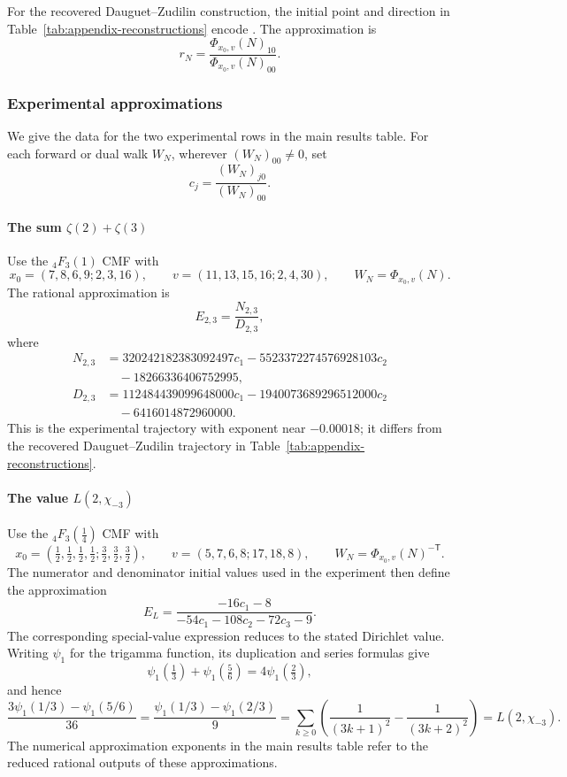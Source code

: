 \documentclass[oneside,english,11pt]{amsart}
\begin{document}
For the recovered Dauguet--Zudilin construction, the initial point and
direction in Table~\ref{tab:appendix-reconstructions} encode
\cite[Eq.~(27)]{dauguetZudilin2014}. The approximation is
\[
 r_N=\frac{\Phi_{x_0,v}(N)_{10}}{\Phi_{x_0,v}(N)_{00}}.
\]

\subsubsection{Experimental approximations}
\label{sec:appendix-extractions}

We give the data for the two experimental rows in
the main results table. For each forward or dual walk $W_N$, wherever $(W_N)_{00}\ne0$, set
\[
 c_j=\frac{(W_N)_{j0}}{(W_N)_{00}}.
\]

\paragraph{\texorpdfstring{The sum $\zeta(2)+\zeta(3)$}{The sum zeta(2)+zeta(3)}}
Use the ${}_4F_3(1)$ CMF with
\[
 x_0=(7,8,6,9;2,3,16),\qquad v=(11,13,15,16;2,4,30),
 \qquad W_N=\Phi_{x_0,v}(N).
\]
The rational approximation is
\[
 E_{2,3}=\frac{N_{2,3}}{D_{2,3}},
\]
where
\begin{align*}
N_{2,3}&=320242182383092497c_1-5523372274576928103c_2\\
          &\quad-18266336406752995,\\
D_{2,3}&=112484439099648000c_1-1940073689296512000c_2\\
          &\quad-6416014872960000.
\end{align*}
This is the experimental trajectory with exponent near $-0.00018$;
it differs from the recovered Dauguet--Zudilin trajectory in
Table~\ref{tab:appendix-reconstructions}.

\paragraph{\texorpdfstring{The value $L(2,\chi_{-3})$}{The value L(2,chi(-3))}}
Use the ${}_4F_3(\tfrac14)$ CMF with
\[
 x_0=(\tfrac12,\tfrac12,\tfrac12,\tfrac12;
       \tfrac32,\tfrac32,\tfrac32),\qquad
 v=(5,7,6,8;17,18,8),\qquad W_N=\Phi_{x_0,v}(N)^{-\mathsf T}.
\]
The numerator and denominator initial values used in the experiment then define the approximation
\[
 E_L=\frac{-16c_1-8}{-54c_1-108c_2-72c_3-9}.
\]
The corresponding special-value expression reduces to the stated
Dirichlet value. Writing $\psi_1$ for the trigamma function,
its duplication and series formulas \cite[5.15.7 and 5.15.1]{NIST:DLMF} give
\[
 \psi_1(\tfrac13)+\psi_1(\tfrac56)=4\psi_1(\tfrac23),
\]
and hence
\[
 \frac{3\psi_1(1/3)-\psi_1(5/6)}{36}
 =\frac{\psi_1(1/3)-\psi_1(2/3)}9
 =\sum_{k\ge0}\left(\frac1{(3k+1)^2}-\frac1{(3k+2)^2}\right)
 =L(2,\chi_{-3}).
\]
The numerical approximation exponents in the main results table
refer to the reduced rational outputs of these approximations.
\end{document}
